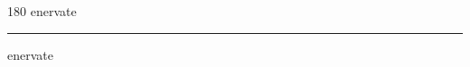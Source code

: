 
\begin{frame}
\begin{center}
\begin{turn}{180}
{\fontsize{2.5cm}{1em}\selectfont enervate}
\end{turn}
\vspace{1em}\par  
\hrule
\vspace{1em}\par  
{\fontsize{2.5cm}{1em}\selectfont enervate}
\end{center}
\end{frame}
